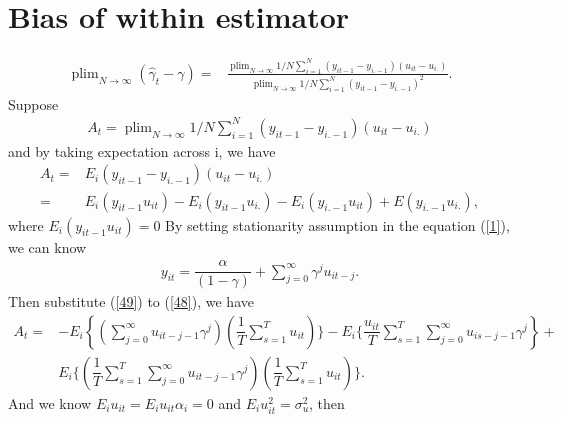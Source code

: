 \documentclass[12pt,a4paper,hyperref]{article}
\DeclareMathOperator*{\plim}{plim}
\begin{document}
\section{Bias of within estimator}
\begin{equation}
\begin{split}
\plim_{N \rightarrow \infty} \left( \hat{\gamma}_{t}-\gamma\right) =&\frac{\plim_{N \rightarrow \infty}1/N \sum^{N}_{i=1}(y_{it-1}-y_{i.-1})(u_{it}-u_{i.})}{\plim_{N \rightarrow \infty}1/N \sum^{N}_{i=1}(y_{it-1}-y_{i.-1})^{2}}.
\end{split}
\end{equation}
Suppose
\begin{align*}
 A_{t}=\plim_{N \rightarrow \infty}1/N \sum^{N}_{i=1}(y_{it-1}-y_{i.-1})(u_{it}-u_{i.})
\end{align*}
and by taking expectation across i, we have
\begin{equation}
\begin{split}
A_{t}=& E_{i}(y_{it-1}-y_{i. -1})(u_{it}-u_{i.}) \\
     =& E_{i}(y_{it-1}u_{it})-E_{i}(y_{it-1}u_{i.})-E_{i}(y_{i.-1}u_{it})+E(y_{i.-1}u_{i.}), \label{48}
\end{split}
\end{equation}
where $E_{i}(y_{it-1}u_{it})=0$ By setting stationarity assumption in the equation (\ref{1}), we can know
\begin{equation}
\begin{split}
y_{it}=\dfrac{\alpha}{(1-\gamma)}+\sum_{j=0}^{\infty} \gamma^{j}u_{it-j}. \label{49}
\end{split}
\end{equation}
Then substitute (\ref{49}) to (\ref{48}), we have
\begin{equation}
\begin{split}
A_{t}= \!&-E_{i} \left\lbrace (\sum^{\infty}_{j=0}u_{it-j-1}\gamma^{j})(\dfrac{1}{T}\sum^{T}_{s=1}u_{it})\}-E_{i} \{ \dfrac{u_{it}}{T} \sum^{T}_{s=1}\sum^{\infty}_{j=0}u_{is-j-1}\gamma^{j} \right\rbrace +  \!\\
& E_{i}\{ ( \dfrac{1}{T}\sum^{T}_{s=1}\sum^{\infty}_{j=0}u_{it-j-1}\gamma^{j})(\dfrac{1}{T}\sum^{T}_{s=1}u_{it})\}.
\end{split}
\end{equation}
And we know $E_{i}u_{it}=E_{i}u_{it}\alpha_{i}=0$ and $E_{i}u_{it}^{2}=\sigma_{u}^{2}$, then
\end{document}
